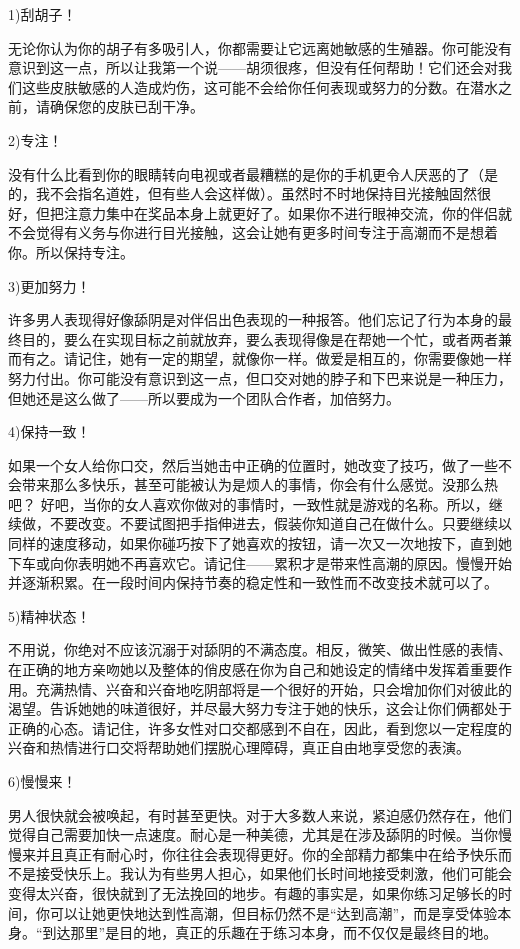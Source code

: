 \documentclass[12pt,UTF8]{ctexbook}
\begin{document}
1)刮胡子！

无论你认为你的胡子有多吸引人，你都需要让它远离她敏感的生殖器。你可能没有意识到这一点，所以让我第一个说——胡须很疼，但没有任何帮助！它们还会对我们这些皮肤敏感的人造成灼伤，这可能不会给你任何表现或努力的分数。在潜水之前，请确保您的皮肤已刮干净。

2)专注！

没有什么比看到你的眼睛转向电视或者最糟糕的是你的手机更令人厌恶的了（是的，我不会指名道姓，但有些人会这样做）。虽然时不时地保持目光接触固然很好，但把注意力集中在奖品本身上就更好了。如果你不进行眼神交流，你的伴侣就不会觉得有义务与你进行目光接触，这会让她有更多时间专注于高潮而不是想着你。所以保持专注。

3)更加努力！

许多男人表现得好像舔阴是对伴侣出色表现的一种报答。他们忘记了行为本身的最终目的，要么在实现目标之前就放弃，要么表现得像是在帮她一个忙，或者两者兼而有之。请记住，她有一定的期望，就像你一样。做爱是相互的，你需要像她一样努力付出。你可能没有意识到这一点，但口交对她的脖子和下巴来说是一种压力，但她还是这么做了——所以要成为一个团队合作者，加倍努力。

4)保持一致！

如果一个女人给你口交，然后当她击中正确的位置时，她改变了技巧，做了一些不会带来那么多快乐，甚至可能被认为是烦人的事情，你会有什么感觉。没那么热吧？ 好吧，当你的女人喜欢你做对的事情时，一致性就是游戏的名称。所以，继续做，不要改变。不要试图把手指伸进去，假装你知道自己在做什么。只要继续以同样的速度移动，如果你碰巧按下了她喜欢的按钮，请一次又一次地按下，直到她下车或向你表明她不再喜欢它。请记住——累积才是带来性高潮的原因。慢慢开始并逐渐积累。在一段时间内保持节奏的稳定性和一致性而不改变技术就可以了。

5)精神状态！

不用说，你绝对不应该沉溺于对舔阴的不满态度。相反，微笑、做出性感的表情、在正确的地方亲吻她以及整体的俏皮感在你为自己和她设定的情绪中发挥着重要作用。充满热情、兴奋和兴奋地吃阴部将是一个很好的开始，只会增加你们对彼此的渴望。告诉她她的味道很好，并尽最大努力专注于她的快乐，这会让你们俩都处于正确的心态。请记住，许多女性对口交都感到不自在，因此，看到您以一定程度的兴奋和热情进行口交将帮助她们摆脱心理障碍，真正自由地享受您的表演。

6)慢慢来！

男人很快就会被唤起，有时甚至更快。对于大多数人来说，紧迫感仍然存在，他们觉得自己需要加快一点速度。耐心是一种美德，尤其是在涉及舔阴的时候。当你慢慢来并且真正有耐心时，你往往会表现得更好。你的全部精力都集中在给予快乐而不是接受快乐上。我认为有些男人担心，如果他们长时间地接受刺激，他们可能会变得太兴奋，很快就到了无法挽回的地步。有趣的事实是，如果你练习足够长的时间，你可以让她更快地达到性高潮，但目标仍然不是“达到高潮”，而是享受体验本身。“到达那里”是目的地，真正的乐趣在于练习本身，而不仅仅是最终目的地。
\end{document}
